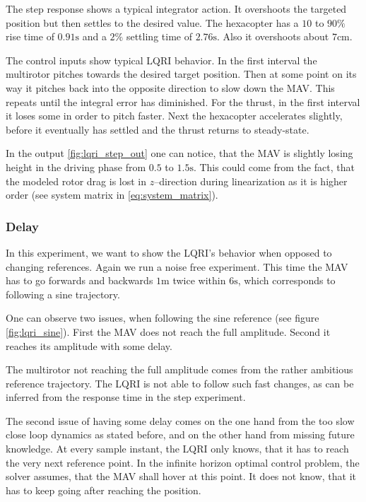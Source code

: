 The step response shows a typical integrator action. It overshoots the targeted position but then settles to the desired value. The hexacopter has a $10$ to $90\si{\percent}$ rise time of $0.91 \si{\second}$ and a $2\si{\percent}$ settling time of $2.76 \si{\second}$. Also it overshoots about $7 \si{\centi\metre}$.

The control inputs show typical LQRI behavior. In the first interval the multirotor pitches towards the desired target position. Then at some point on its way it pitches back into the opposite direction to slow down the MAV. This repeats until the integral error has diminished. For the thrust, in the first interval it loses some in order to pitch faster. Next the hexacopter accelerates slightly, before it eventually has settled and the thrust returns to steady-state.

In the output \ref{fig:lqri_step_out} one can notice, that the MAV is slightly losing height in the driving phase from $0.5$ to $1.5 \si{\second}$. This could come from the fact, that the modeled rotor drag is lost in $z$--direction during linearization as it is higher order (see system matrix in \ref{eq:system_matrix}).

\subsubsection{Delay}
In this experiment, we want to show the LQRI's behavior when opposed to changing references. Again we run a noise free experiment. This time the MAV has to go forwards and backwards $1\si{\metre}$ twice within $6 \si{\second}$, which corresponds to following a sine trajectory.

One can observe two issues, when following the sine reference (see figure \ref{fig:lqri_sine}). First the MAV does not reach the full amplitude. Second it reaches its amplitude with some delay.

The multirotor not reaching the full amplitude comes from the rather ambitious reference trajectory. The LQRI is not able to follow such fast changes, as can be inferred from the response time in the step experiment.

The second issue of having some delay comes on the one hand from the too slow close loop dynamics as stated before, and on the other hand from missing future knowledge. At every sample instant, the LQRI only knows, that it has to reach the very next reference point. In the infinite horizon optimal control problem, the solver assumes, that the MAV shall hover at this point. It does not know, that it has to keep going after reaching the position.

